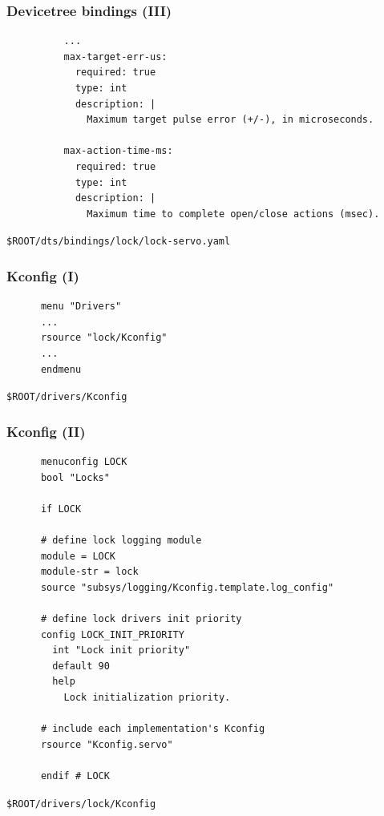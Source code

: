\documentclass[handout]{beamer}
\begin{document}
\begin{frame}[fragile]
  \frametitle{Devicetree bindings (III)}

  \begin{listing}[H]
    \begin{verbatim}
          ...
          max-target-err-us:
            required: true
            type: int
            description: |
              Maximum target pulse error (+/-), in microseconds.

          max-action-time-ms:
            required: true
            type: int
            description: |
              Maximum time to complete open/close actions (msec).
    \end{verbatim}
    \caption{\texttt{\$ROOT/dts/bindings/lock/lock-servo.yaml}}
  \end{listing}
\end{frame}

\begin{frame}[fragile]
  \frametitle{Kconfig (I)}

  \begin{listing}[H]
    \begin{verbatim}
      menu "Drivers"
      ...
      rsource "lock/Kconfig"
      ...
      endmenu
    \end{verbatim}
    \caption{\texttt{\$ROOT/drivers/Kconfig}}
  \end{listing}
\end{frame}

\begin{frame}[fragile]
  \frametitle{Kconfig (II)}
  \begin{listing}[H]
    \begin{verbatim}
      menuconfig LOCK
      bool "Locks"
    
      if LOCK

      # define lock logging module
      module = LOCK
      module-str = lock
      source "subsys/logging/Kconfig.template.log_config"

      # define lock drivers init priority
      config LOCK_INIT_PRIORITY
        int "Lock init priority"
        default 90
        help
          Lock initialization priority.

      # include each implementation's Kconfig
      rsource "Kconfig.servo"

      endif # LOCK
    \end{verbatim}
    \caption{\texttt{\$ROOT/drivers/lock/Kconfig}}
  \end{listing}
\end{frame}
\end{document}
